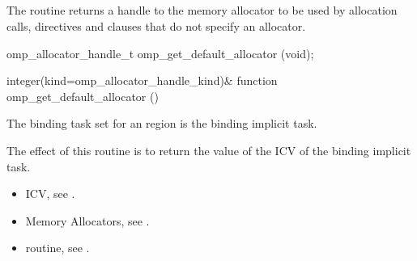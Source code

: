 \subsection{}
\label{subsec:omp_get_default_allocator}

\summary
The  routine returns a handle to 
the memory allocator to be used by allocation calls,  
directives and  clauses that do not specify an allocator.

\format
\begin{ccppspecific}
\begin{ompcFunction}
omp_allocator_handle_t omp_get_default_allocator (void);
\end{ompcFunction}
\end{ccppspecific}
\begin{fortranspecific}
\begin{ompfFunction}
integer(kind=omp_allocator_handle_kind)&
function omp_get_default_allocator ()
\end{ompfFunction}
\end{fortranspecific}

\binding
The binding task set for an  region 
is the binding implicit task.

\effect
The effect of this routine is to return the value of the 
 ICV of the binding implicit task.

\crossreferences
\begin{itemize}
\item {} ICV, see .

\item Memory Allocators, see .

\item {} routine, see .
\end{itemize}

